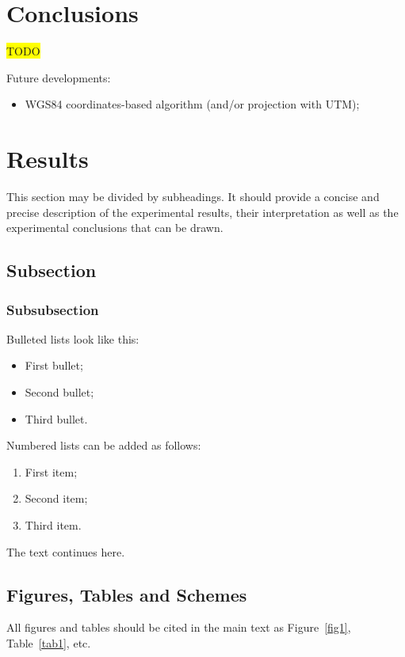 \documentclass[journal,article,submit,pdftex,moreauthors]{Definitions/mdpi}
\begin{document}
\section{Conclusions}
\colorbox{yellow}{TODO}

Future developments:
\begin{itemize}
	\item WGS84 coordinates-based algorithm (and/or projection with UTM);
\end{itemize}


\section{Results}

This section may be divided by subheadings. It should provide a concise and precise description of the experimental results, their interpretation as well as the experimental conclusions that can be drawn.
\subsection{Subsection}
\subsubsection{Subsubsection}

Bulleted lists look like this:
\begin{itemize}
\item	First bullet;
\item	Second bullet;
\item	Third bullet.
\end{itemize}

Numbered lists can be added as follows:
\begin{enumerate}
\item	First item; 
\item	Second item;
\item	Third item.
\end{enumerate}

The text continues here. 

\subsection{Figures, Tables and Schemes}

All figures and tables should be cited in the main text as Figure~\ref{fig1}, Table~\ref{tab1}, etc.
\end{document}
